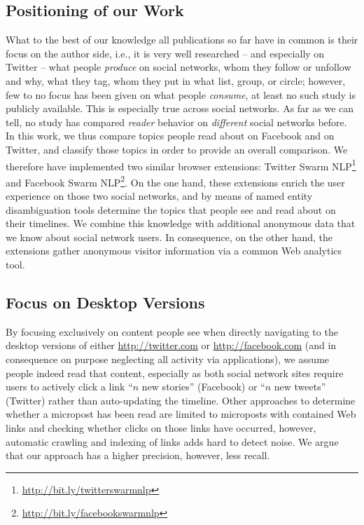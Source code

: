 \documentclass{iosart2c}
\begin{document}
\subsection{Positioning of our Work}
What to the best of our knowledge all publications so far have in common is their focus on the author side, i.e., it is very well researched -- and especially on Twitter -- what people \emph{produce} on social networks, whom they follow or unfollow and why, what they tag, whom they put in what list, group, or circle; however, few to no focus has been given on what people \emph{consume}, at least no such study is publicly available.
This is especially true across social networks.
As far as we can tell, no study has compared \emph{reader} behavior on \emph{different} social networks before.
In this work, we thus compare topics people read about on Facebook and on Twitter, and classify those topics in order to provide an overall comparison. 
We therefore have implemented two similar browser extensions: Twitter Swarm NLP\footnote{\url{http://bit.ly/twitterswarmnlp}} and Facebook Swarm NLP\footnote{\url{http://bit.ly/facebookswarmnlp}}. 
On the one hand, these extensions enrich the user experience on those two social networks, and by means of named entity disambiguation tools determine the topics that people see and read about on their timelines.
We combine this knowledge with additional anonymous data that we know about social network users.
In consequence, on the other hand, the extensions gather anonymous visitor information via a common Web analytics tool.

\subsection{Focus on Desktop Versions}
By focusing exclusively on content people see when directly navigating to the desktop versions of either \url{http://twitter.com} or \url{http://facebook.com} (and in consequence on purpose neglecting all activity via applications), we assume people indeed read that content, especially as both social network sites require users to actively click a link ``$\mathit{n}$ new stories'' (Facebook) or ``$\mathit{n}$ new tweets'' (Twitter) rather than auto-updating the timeline. Other approaches to determine whether a micropost has been read are limited to microposts with contained Web links and checking whether clicks on those links have occurred, however, automatic crawling and indexing of links adds hard to detect noise. We argue that our approach has a higher precision, however, less recall.
\end{document}
